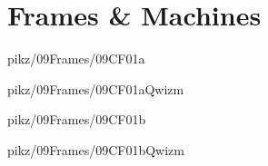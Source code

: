 \documentclass[9pt,xcolor={svgnames, x11names}]{beamer}
\begin{document}


%   


\section{Frames \& Machines}


\begin{frame}{pikz/09Frames/09CF01a}
  
\end{frame}


\begin{frame}{pikz/09Frames/09CF01aQwizm}
  
\end{frame}


\begin{frame}{pikz/09Frames/09CF01b}
  
\end{frame}


\begin{frame}{pikz/09Frames/09CF01bQwizm}
  
\end{frame}
\end{document}
